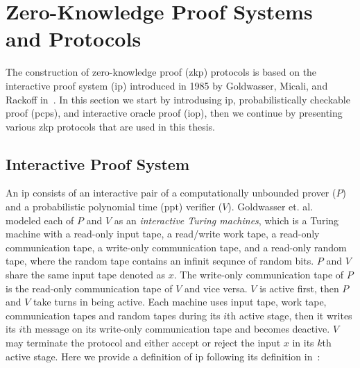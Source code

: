\section{Zero-Knowledge Proof Systems and Protocols}

The construction of zero-knowledge proof (\gls{zkp}) protocols is based on the interactive proof system (\gls{ip}) introduced in 1985 by Goldwasser, Micali, and Rackoff in~\cite{Goldwasser1985}.  In this section we start by introdusing \gls{ip}, probabilistically checkable proof (\gls{pcp}s), and interactive oracle proof (\gls{iop}), then we continue by presenting various \gls{zkp} protocols that are used in this thesis. 

\subsection{Interactive Proof System}\label{sec:Prel_IP}

 An \gls{ip} consists of  an interactive pair of a computationally unbounded prover ($P$) and a probabilistic polynomial time (\gls{ppt})  verifier ($V$).  Goldwasser et. al.~\cite{Goldwasser1985} modeled each of $P$ and $V$ as an \textit{interactive Turing machines}, which is a Turing machine with a read-only input tape, a read/write work tape, a read-only communication tape, a write-only communication tape, and a read-only random tape, where the random tape contains an infinit sequnce of random bits. $P$  and $V$ share the same input tape denoted as $x$. The write-only communication tape of $P$ is the read-only communication tape of $V$ and vice versa.  $V$ is active first, then $P$ and $V$ take turns in being active. Each machine uses input tape, work tape, communication tapes and random tapes during its $i$th active stage, then it writes its $i$th message on its write-only communication tape and becomes deactive. $V$ may terminate the protocol and either accept or reject the input $x$ in its $k$th active stage. Here we provide a definition of \gls{ip} following its definition in~\cite{Goldwasser1985}:
 
